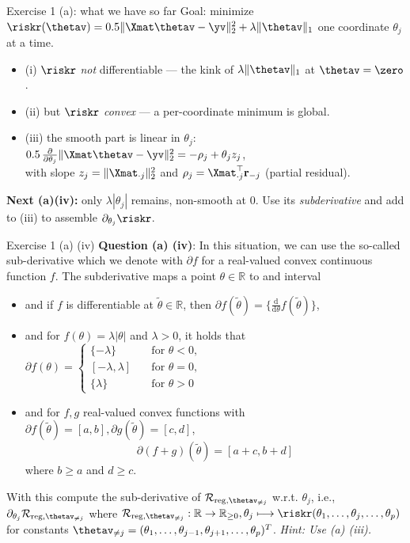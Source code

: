 \documentclass[aspectratio=169]{beamer}
\begin{document}
\begin{frame}[t]{Exercise 1 (a): what we have so far}
	\small
	Goal: minimize $\riskr(\thetav) = 0.5\|\Xmat\thetav-\yv\|_2^2 + \lambda\|\thetav\|_1$ one coordinate $\theta_j$ at a time.
	\medskip
	\begin{itemize}
		\item (i) $\riskr$ \emph{not} differentiable --- the kink of $\lambda\|\thetav\|_1$ at $\thetav = \zero$.
		\item (ii) but $\riskr$ \emph{convex} --- a per-coordinate minimum is global.
		\item (iii) the smooth part is linear in $\theta_j$: $0.5\,\tfrac{\partial}{\partial\theta_j}\|\Xmat\thetav-\yv\|_2^2 = -\rho_j + \theta_j z_j$, \\ with slope $z_j = \|\Xmat_{\cdot j}\|_2^2$ and $\rho_j = \Xmat_{\cdot j}^\top\mathbf{r}_{-j}$ (partial residual).
	\end{itemize}
	\medskip
	\textbf{Next (a)(iv):} only $\lambda|\theta_j|$ remains, non-smooth at $0$. Use its \emph{subderivative} and add to (iii) to assemble $\partial_{\theta_j}\riskr$.
\end{frame}

\begin{frame}{Exercise 1 (a) (iv)}
	\small
	\textbf{Question (a) (iv)}: In this situation, we can use the so-called sub-derivative which we denote with $\partial f$ for a real-valued convex continuous function $f$. The subderivative maps a point $\theta \in \mathbb{R}$ to and interval
	\begin{itemize}
		\item and if $f$ is differentiable at $\tilde{\theta} \in \mathbb{R}$, then $\partial f(\tilde{\theta}) = \{ \frac{\mathrm{d}}{\mathrm{d}\theta} f(\tilde{\theta}) \}$,
		\item and for $f(\theta) = \lambda |\theta|$ and $\lambda > 0$, it holds that $\partial f(\theta) = \begin{cases}
			\{ -\lambda \} \quad & \text{for } \theta < 0, \\
			[ -\lambda, \lambda] \quad & \text{for } \theta = 0, \\
			\{ \lambda \} \quad & \text{for } \theta > 0
		\end{cases}
		$
		\item and for $f, g$ real-valued convex functions with $\partial f(\tilde{\theta}) = [a, b], \partial g(\tilde{\theta}) = [c, d]$, $$\partial(f+g)(\tilde{\theta}) = [a + c, b + d]$$ where $b \geq a$ and $d \geq c$.
	\end{itemize}
	With this compute the sub-derivative of $\mathcal{R}_{\text{reg}, \thetav_{\neq j}}$ w.r.t. $\theta_j$, i.e., $\partial_{\theta_j} \mathcal{R}_{\text{reg}, \thetav_{\neq j}} $ where $\mathcal{R}_{\text{reg}, \thetav_{\neq j}}: \mathbb{R} \to \mathbb{R}_{\geq 0}, \theta_j \longmapsto \riskr(\theta_1, \ldots, \theta_j, \ldots, \theta_p)$ for constants $\thetav_{\neq j} = (\theta_1, \ldots, \theta_{j-1}, \theta_{j+1}, \ldots, \theta_p)^T$. \emph{Hint: Use (a) (iii).}
\end{frame}
\end{document}
